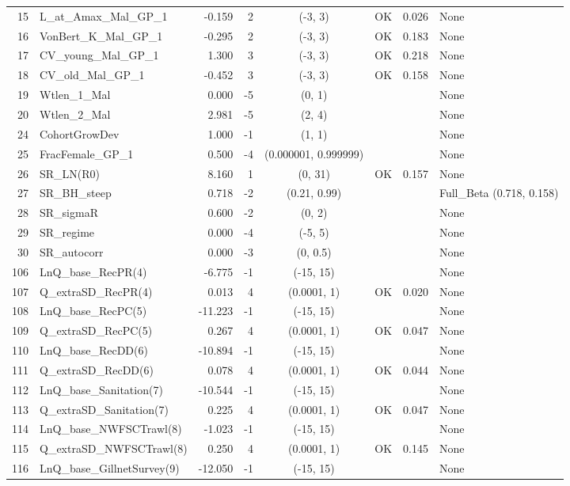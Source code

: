 \documentclass[12pt,]{article}
\begin{document}
\begin{landscape}
\begin{longtable}{rlrrcccl}
  15 & L\_at\_Amax\_Mal\_GP\_1 & -0.159 & 2 & (-3, 3) & OK & 0.026 & None \\ 
  16 & VonBert\_K\_Mal\_GP\_1 & -0.295 & 2 & (-3, 3) & OK & 0.183 & None \\ 
  17 & CV\_young\_Mal\_GP\_1 & 1.300 & 3 & (-3, 3) & OK & 0.218 & None \\ 
  18 & CV\_old\_Mal\_GP\_1 & -0.452 & 3 & (-3, 3) & OK & 0.158 & None \\ 
  19 & Wtlen\_1\_Mal & 0.000 & -5 & (0, 1) &  &  & None \\ 
  20 & Wtlen\_2\_Mal & 2.981 & -5 & (2, 4) &  &  & None \\ 
  24 & CohortGrowDev & 1.000 & -1 & (1, 1) &  &  & None \\ 
  25 & FracFemale\_GP\_1 & 0.500 & -4 & (0.000001, 0.999999) &  &  & None \\ 
  26 & SR\_LN(R0) & 8.160 & 1 & (0, 31) & OK & 0.157 & None \\ 
  27 & SR\_BH\_steep & 0.718 & -2 & (0.21, 0.99) &  &  & Full\_Beta (0.718, 0.158) \\ 
  28 & SR\_sigmaR & 0.600 & -2 & (0, 2) &  &  & None \\ 
  29 & SR\_regime & 0.000 & -4 & (-5, 5) &  &  & None \\ 
  30 & SR\_autocorr & 0.000 & -3 & (0, 0.5) &  &  & None \\ 
  106 & LnQ\_base\_RecPR(4) & -6.775 & -1 & (-15, 15) &  &  & None \\ 
  107 & Q\_extraSD\_RecPR(4) & 0.013 & 4 & (0.0001, 1) & OK & 0.020 & None \\ 
  108 & LnQ\_base\_RecPC(5) & -11.223 & -1 & (-15, 15) &  &  & None \\ 
  109 & Q\_extraSD\_RecPC(5) & 0.267 & 4 & (0.0001, 1) & OK & 0.047 & None \\ 
  110 & LnQ\_base\_RecDD(6) & -10.894 & -1 & (-15, 15) &  &  & None \\ 
  111 & Q\_extraSD\_RecDD(6) & 0.078 & 4 & (0.0001, 1) & OK & 0.044 & None \\ 
  112 & LnQ\_base\_Sanitation(7) & -10.544 & -1 & (-15, 15) &  &  & None \\ 
  113 & Q\_extraSD\_Sanitation(7) & 0.225 & 4 & (0.0001, 1) & OK & 0.047 & None \\ 
  114 & LnQ\_base\_NWFSCTrawl(8) & -1.023 & -1 & (-15, 15) &  &  & None \\ 
  115 & Q\_extraSD\_NWFSCTrawl(8) & 0.250 & 4 & (0.0001, 1) & OK & 0.145 & None \\ 
  116 & LnQ\_base\_GillnetSurvey(9) & -12.050 & -1 & (-15, 15) &  &  & None \\ 

\end{longtable}
\end{landscape}
\end{document}
